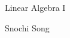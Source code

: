 \documentclass[linearalgebraI]{subfiles}
\begin{document}
    \begin{titlepage}
    \centering
    \vspace*{8cm}
    {\serifastd\Huge Linear Algebra I \par}
    \vspace{1cm}
    {\serifastd\Large Snochi Song\par}
    \vspace{2.5cm}
    \algebraicon
    \vspace*{\fill}
    \cleardoublepage
    \end{titlepage}

    \toc
\end{document}
